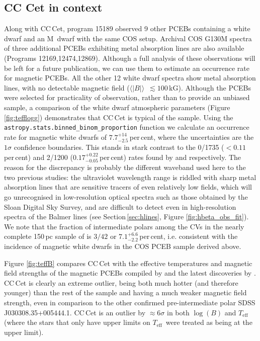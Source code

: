 \documentclass[fleqn,usenatbib]{mnras}
\newcommand{\bs}{\ensuremath{\langle \vert B \vert \rangle}}
\newcommand{\Teff}{\mbox{$T_{\mathrm{eff}}$}}
\begin{document}
\subsection{CC Cet in context}
Along with CC\,Cet, program 15189 observed 9 other PCEBs containing a white dwarf and an M~dwarf with the same COS setup. Archival COS G130M spectra of three additional PCEBs exhibiting metal absorption lines are also available (Programs 12169,12474,12869). Although a full analysis of these observations will be left for a future publication, we can use them to estimate an occurrence rate for magnetic PCEBs. All the other 12 white dwarf spectra show metal absorption lines, with no detectable magnetic field (\bs\ $\lesssim100$\,kG). Although the PCEBs were selected for practicality of observation, rather than to provide an unbiased sample, a comparison of the white dwarf atmospheric parameters (Figure \ref{fig:tefflogg}) demonstrates that CC\,Cet is typical of the sample. Using the \texttt{astropy.stats.binned\_binom\_proportion} function we calculate an occurrence rate for magnetic white dwarfs of $7.7^{+14}_{-2.5}$\,per\,cent, where the uncertainties are the $1\sigma$ confidence boundaries. This stands in stark contrast to the 0/1735 ($<0.11$\,per\,cent) and 2/1200 ($0.17^{+0.22}_{-0.05}$\,per\,cent) rates found by \citet{liebertetal15-1} and \citep{silvestrietal07-1} respectively. The reason for the discrepancy is probably the different waveband used here to the two previous studies: the ultraviolet wavelength range is riddled with sharp metal absorption lines that are sensitive tracers of even relatively low fields, which will go unrecognised in low-resolution optical spectra such as those obtained by the Sloan Digital Sky Survey, and are difficult to detect even in high-resolution spectra of the Balmer lines (see Section\,\ref{sec:hlines}, Figure \ref{fig:hbeta_obs_fit}). We note that the fraction of intermediate polars among the CVs in the nearly complete 150\,pc sample of \citet{palaetal20-1} is $3/42$ or $7.1^{+6.6}_{-2.2}$\,per\,cent, i.e. consistent with the incidence of magnetic white dwarfs in the COS PCEB sample derived above.

Figure \ref{fig:teffB} compares CC\,Cet with the effective temperatures and magnetic field strengths of the magnetic PCEBs compiled by \citet{ferrarioetal15-1} and the latest discoveries by \citet{parsonsetal21-1}. CC\,Cet is clearly an extreme outlier, being both much hotter (and therefore younger) than the rest of the sample and having a much weaker magnetic field strength, even in comparison to the other confirmed pre-intermediate polar SDSS\,J030308.35+005444.1. CC\,Cet is an outlier by $\approx6\sigma$ in both $\log (B)$ and \Teff (where the stars that only have upper limits on \Teff\ were treated as being at the upper limit). 
\end{document}
